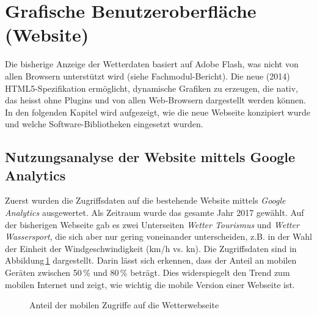 \section{Grafische Benutzeroberfläche (Website)}
Die bisherige Anzeige der Wetterdaten basiert auf Adobe Flash, was nicht von allen Browsern unterstützt wird (siehe Fachmodul-Bericht\cite{BilWie2018MUIu}). Die neue (2014) HTML5-Spezifikation ermöglicht, dynamische Grafiken zu erzeugen, die nativ, das heisst ohne Plugins und von allen Web-Browsern dargestellt werden können. In den folgenden Kapitel wird aufgezeigt, wie die neue Webseite konzipiert wurde und welche Software-Bibliotheken eingesetzt wurden.


\subsection{Nutzungsanalyse der Website mittels Google Analytics}
\label{subsec:googleAnalytics}
Zuerst wurden die Zugriffsdaten auf die bestehende Website mittels \emph{Google Analytics} ausgewertet. Als Zeitraum wurde das gesamte Jahr 2017 gewählt. Auf der bisherigen Webseite gab es zwei Unterseiten \emph{Wetter Tourismus} und \emph{Wetter Wassersport}, die sich aber nur gering voneinander unterscheiden, z.B. in der Wahl der Einheit der Windgeschwindigkeit (km/h vs. kn). Die Zugriffsdaten sind in Abbildung\,\ref{img:google_mobile} dargestellt. Darin lässt sich erkennen, dass der Anteil an mobilen Geräten zwischen 50\,\% und 80\,\% beträgt. Dies widerspiegelt den Trend zum mobilen Internet und zeigt, wie wichtig die mobile Version einer Webseite ist.

\begin{figure}[htb!]
	\centering
	\caption{Anteil der mobilen Zugriffe auf die Wetterwebseite}
	\label{img:google_mobile}
\end{figure}

